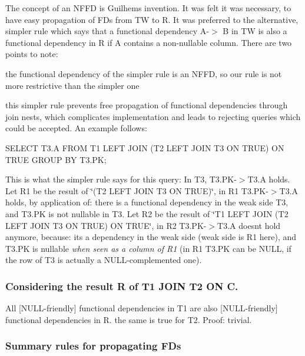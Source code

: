 The concept of an N\+F\+FD is Guilhem\textquotesingle{}s invention. It was felt it was necessary, to have easy propagation of F\+Ds from TW to R. It was preferred to the alternative, simpler rule which says that a functional dependency A-\/$>$ B in TW is also a functional dependency in R if A contains a non-\/nullable column. There are two points to note\+:
\begin{DoxyItemize}
\item the functional dependency of the simpler rule is an N\+F\+FD, so our rule is not more restrictive than the simpler one
\item this simpler rule prevents free propagation of functional dependencies through join nests, which complicates implementation and leads to rejecting queries which could be accepted. An example follows\+: \begin{DoxyVerb}SELECT T3.A
FROM T1 LEFT JOIN (T2 LEFT JOIN T3 ON  TRUE) ON  TRUE
GROUP BY T3.PK;
\end{DoxyVerb}
 This is what the simpler rule says for this query\+: In T3, T3.\+PK-\/$>$T3.\+A holds. Let R1 be the result of \char`\"{}(\+T2 L\+E\+F\+T J\+O\+I\+N T3 O\+N T\+R\+U\+E)\char`\"{}, in R1 T3.\+PK-\/$>$T3.\+A holds, by application of\+: there is a functional dependency in the weak side T3, and T3.\+PK is not nullable in T3. Let R2 be the result of \char`\"{}\+T1 L\+E\+F\+T J\+O\+I\+N (\+T2 L\+E\+F\+T J\+O\+I\+N T3 O\+N T\+R\+U\+E) O\+N T\+R\+U\+E\char`\"{}, in R2 T3.\+PK-\/$>$T3.\+A doesn\textquotesingle{}t hold anymore, because\+: it\textquotesingle{}s a dependency in the weak side (weak side is R1 here), and T3.\+PK is nullable {\itshape when seen as a column of R1} (in R1 T3.\+PK can be N\+U\+LL, if the row of T3 is actually a N\+U\+LL-\/complemented one).
\end{DoxyItemize}\hypertarget{group__AGGREGATE__CHECKS_PROPAGINNER}{}\subsubsection{Considering the result R of T1 J\+O\+I\+N T2 O\+N C.}\label{group__AGGREGATE__CHECKS_PROPAGINNER}
All \mbox{[}N\+U\+LL-\/friendly\mbox{]} functional dependencies in T1 are also \mbox{[}N\+U\+LL-\/friendly\mbox{]} functional dependencies in R. the same is true for T2. Proof\+: trivial.\hypertarget{group__AGGREGATE__CHECKS_PROPAGSUMMARY}{}\subsubsection{Summary rules for propagating F\+Ds}\label{group__AGGREGATE__CHECKS_PROPAGSUMMARY}

